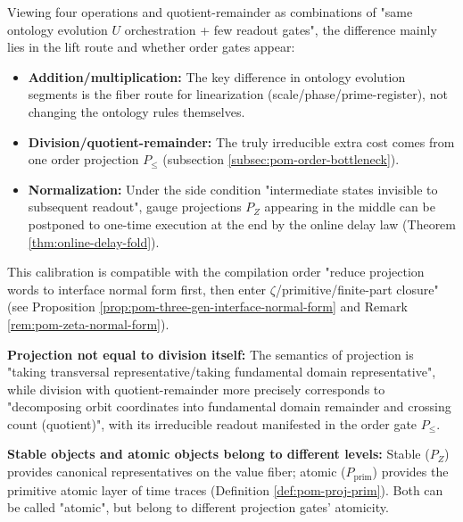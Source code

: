\begin{remark}\label{rem:pom-two-projection-normal-form}
Viewing four operations and quotient-remainder as combinations of "same ontology evolution \(U\) orchestration + few readout gates", the difference mainly lies in the lift route and whether order gates appear:
\begin{itemize}
  \item \textbf{Addition/multiplication:} The key difference in ontology evolution segments is the fiber route for linearization (scale/phase/prime-register), not changing the ontology rules themselves.
  \item \textbf{Division/quotient-remainder:} The truly irreducible extra cost comes from one order projection \(P_{\le}\) (subsection \ref{subsec:pom-order-bottleneck}).
  \item \textbf{Normalization:} Under the side condition "intermediate states invisible to subsequent readout", gauge projections \(P_Z\) appearing in the middle can be postponed to one-time execution at the end by the online delay law (Theorem \ref{thm:online-delay-fold}).
\end{itemize}
This calibration is compatible with the compilation order "reduce projection words to interface normal form first, then enter \(\zeta\)/primitive/finite-part closure" (see Proposition \ref{prop:pom-three-gen-interface-normal-form} and Remark \ref{rem:pom-zeta-normal-form}).
\end{remark}

\begin{remark}[Clarification: projection \texorpdfstring{$\neq$}{!=} division; stable \texorpdfstring{$\neq$}{!=} prime]\label{rem:pom-projection-vs-division}
\textbf{Projection not equal to division itself:} The semantics of projection is "taking transversal representative/taking fundamental domain representative", while division with quotient-remainder more precisely corresponds to "decomposing orbit coordinates into fundamental domain remainder and crossing count (quotient)", with its irreducible readout manifested in the order gate \(P_{\le}\).
\par
\textbf{Stable objects and atomic objects belong to different levels:} Stable (\(P_Z\)) provides canonical representatives on the value fiber; atomic (\(P_{\mathrm{prim}}\)) provides the primitive atomic layer of time traces (Definition \ref{def:pom-proj-prim}). Both can be called "atomic", but belong to different projection gates' atomicity.
\end{remark}

